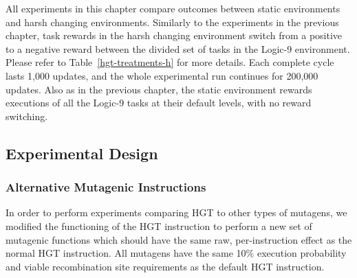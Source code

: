 \documentclass[PhD]{msu-thesis}
\begin{document}
All experiments in this chapter compare outcomes between static environments and harsh changing environments. Similarly to the experiments in the previous chapter, task rewards in the harsh changing environment switch from a positive to a negative reward between the divided set of tasks in the Logic-9 environment. Please refer to Table~\ref{hgt-treatments-h} for more details. Each complete cycle lasts 1,000 updates, and the whole experimental run continues for 200,000 updates.
Also as in the previous chapter, the static environment rewards executions of all the Logic-9 tasks at their default levels, with no reward switching.

\subsection{Experimental Design}

\subsubsection{Alternative Mutagenic Instructions}
In order to perform experiments comparing HGT to other types of mutagens, we modified the functioning of the HGT instruction to perform a new set of mutagenic functions which should have the same raw, per-instruction effect as the normal HGT instruction. All mutagens have the same 10\% execution probability and viable recombination site requirements as the default HGT instruction.
\end{document}
